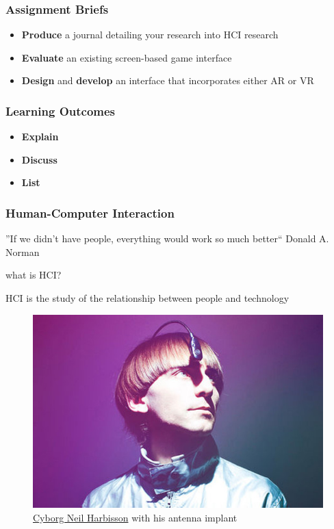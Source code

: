 \begin{frame}
	\frametitle{Assignment Briefs}
	\begin{itemize}
		\item \textbf{Produce} a journal detailing your research into HCI research
		\item \textbf{Evaluate} an existing screen-based game interface
		\item \textbf{Design} and \textbf{develop} an interface that incorporates either AR or VR
	\end{itemize}
\end{frame}

\begin{frame}
	\frametitle{Learning Outcomes }
	
	\begin{itemize}
		\item \textbf{Explain}
		\item \textbf{Discuss} 
		\item \textbf{List} 
	\end{itemize}
\end{frame}

\begin{frame}
	\frametitle{Human-Computer Interaction}
	''If we didn't have people, everything would work so much better`` Donald A. Norman
	
	\begin{center}
		\huge what is HCI?
	\end{center}
\end{frame}

\begin{frame}
	\begin{center}
	HCI is the study of the relationship between people and technology
	\end{center}
	\begin{figure}
		\includegraphics[scale=.45]{assets/cyborgist}
		\caption{\href{https://www.youtube.com/watch?v=C_OnYqx3ynA}{Cyborg Neil Harbisson} with his antenna implant}
	\end{figure}
\end{frame}

